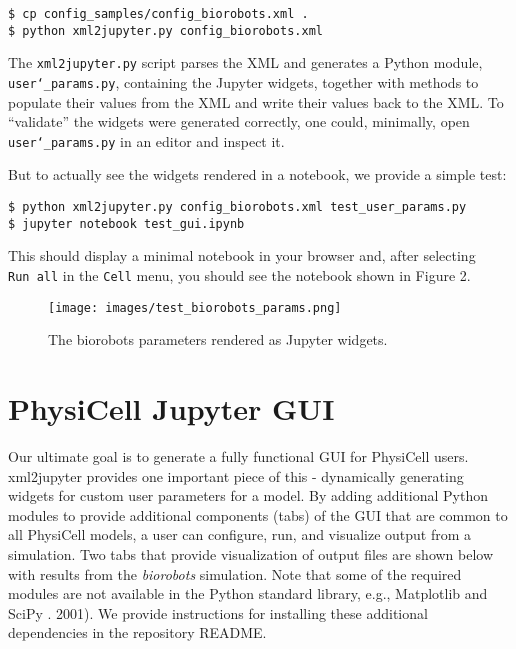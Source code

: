 \documentclass[10pt,letterpaper]{article}
\begin{document}
\begin{verbatim}
$ cp config_samples/config_biorobots.xml .
$ python xml2jupyter.py config_biorobots.xml 
\end{verbatim}

\begin{sloppypar}
The \texttt{xml2jupyter.py} script parses the XML and generates a Python
module, 
\texttt{user\char`_params.py}, 
containing the Jupyter widgets,
together with methods to populate their values from the XML and write
their values back to the XML. To ``validate'' the widgets were generated
correctly, one could, minimally, open \texttt{user\char`_params.py} in an
editor and inspect it.
\end{sloppypar}

But to actually see the widgets rendered in a notebook, we provide a
simple test:

\begin{verbatim}
$ python xml2jupyter.py config_biorobots.xml test_user_params.py
$ jupyter notebook test_gui.ipynb
\end{verbatim}

This should display a minimal notebook in your browser and, after
selecting \texttt{Run\ all} in the \texttt{Cell} menu, you should see
the notebook shown in Figure 2.

\begin{figure}
\centering
\texttt{[image: images/test\_biorobots\_params.png]}
\caption{The biorobots parameters rendered as Jupyter widgets.}
\end{figure}

\section*{PhysiCell Jupyter GUI}

Our ultimate goal is to generate a fully functional GUI for PhysiCell
users. xml2jupyter provides one important piece of this - dynamically
generating widgets for custom user parameters for a model. By adding
additional Python modules to provide additional components (tabs) of the
GUI that are common to all PhysiCell models, a user can configure, run,
and visualize output from a simulation. Two tabs that provide
visualization of output files are shown below with results from the
\emph{biorobots} simulation. Note that some of the required modules are
not available in the Python standard library, e.g., Matplotlib \cite{Hunter:2007}
and SciPy \cite{Jones:2001}. 2001). We provide instructions for
installing these additional dependencies in the repository README.
\end{document}
